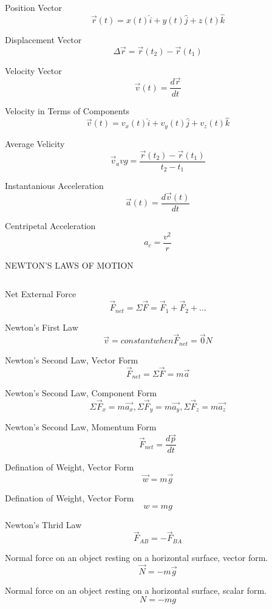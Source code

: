 \documentclass[12pt, letterpaper, twoside]{article}
\begin{document}
$$ $$  

Position Vector
$$\overrightarrow{r}(t) = x(t) \hat{i} + y(t) \hat{j} + z(t) \hat{k}$$


Displacement Vector
$$\Delta \overrightarrow{r}=\overrightarrow{r}(t_2) -  \overrightarrow{r}(t_1)$$


Velocity Vector
$$\overrightarrow{v}(t)= \frac{d \overrightarrow{r}}{dt}$$


Velocity in Terms of Components
$$\overrightarrow{v}(t) = v_x(t) \hat{i} + v_y(t) \hat{j} + v_z(t) \hat{k}$$


Average Velicity
$$\overrightarrow{v}_avg = \frac{\overrightarrow{r}(t_2) -  \overrightarrow{r}(t_1)}{t_2 - t_1}$$


Instantanious Acceleration
$$\overrightarrow{a}(t)= \frac{d \overrightarrow{v}(t)}{dt}$$


Centripetal Acceleration
$$a_c = \frac{v^2}{r}$$



\newpage

NEWTON'S LAWS OF MOTION

$$ $$


Net External Force
$$\overrightarrow{F}_{net} = \Sigma \overrightarrow{F} = \overrightarrow{F}_1+\overrightarrow{F}_2 +...$$


Newton's First Law
$$\overrightarrow{v} = constant when \overrightarrow{F}_{net} = \overrightarrow{0} N$$


Newton's Second Law, Vector Form
$$\overrightarrow{F}_{net} = \Sigma \overrightarrow{F} = m \overrightarrow{a}$$


Newton's Second Law, Component Form
$$\Sigma \overrightarrow{F}_x = m \overrightarrow{a_x}, \Sigma \overrightarrow{F}_y = m \overrightarrow{a_y},\Sigma \overrightarrow{F}_z = m \overrightarrow{a_z}$$



Newton's Second Law, Momentum Form
$$\overrightarrow{F}_{net} = \frac{d \overrightarrow{p}}{dt}$$


Defination of Weight, Vector Form
$$\overrightarrow{w} = m \overrightarrow{g}$$


Defination of Weight, Vector Form
$$w = mg$$


Newton's Thrid Law
$$\overrightarrow{F}_{AB} = - \overrightarrow{F}_{BA}$$

Normal force on an object resting on a horizontal surface,
vector form.
$$\overrightarrow{N} = -m \overrightarrow{g}$$

Normal force on an object resting on a horizontal surface,
scalar form.
$$N = -mg$$
\end{document}
